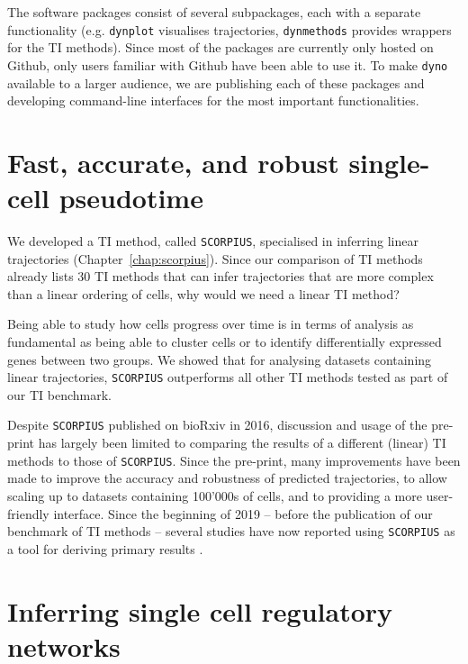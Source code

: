 The software packages consist of several subpackages, each with a separate functionality (e.g. \texttt{dynplot} visualises trajectories, \texttt{dynmethods} provides wrappers for the TI methods). Since most of the packages are currently only hosted on Github, only users familiar with Github have been able to use it. To make \texttt{dyno} available to a larger audience, we are publishing each of these packages and developing command-line interfaces for the most important functionalities.



\section{Fast, accurate, and robust single-cell pseudotime}

We developed a TI method, called \texttt{SCORPIUS}, specialised in inferring linear trajectories (Chapter~\ref{chap:scorpius}). Since our comparison of TI methods already lists 30 TI methods that can infer trajectories that are more complex than a linear ordering of cells, why would we need a linear TI method?

Being able to study how cells progress over time is in terms of analysis as fundamental as being able to cluster cells or to identify differentially expressed genes between two groups. We showed that for analysing datasets containing linear trajectories, \texttt{SCORPIUS} outperforms all other TI methods tested as part of our TI benchmark. 

Despite \texttt{SCORPIUS} published on bioRxiv in 2016, discussion and usage of the pre-print has largely been limited to comparing the results of a different (linear) TI methods to those of \texttt{SCORPIUS}. Since the pre-print, many improvements have been made to improve the accuracy and robustness of predicted trajectories, to allow scaling up to datasets containing 100'000s of cells, and to providing a more user-friendly interface. Since the beginning of 2019 -- before the publication of our benchmark of TI methods -- several studies have now reported using \texttt{SCORPIUS} as a tool for deriving primary results \cite{damond_maphumantype_2019, cheng_multifactorialheterogeneityvirusspecific_2019, tibbitt_singlecellrnasequencing_2019, hove_singlecellatlasmouse_2019, wouters_singlecellgeneregulatory_2019, reimegard_combinedmrnaprotein_2019}.


\section{Inferring single cell regulatory networks}


